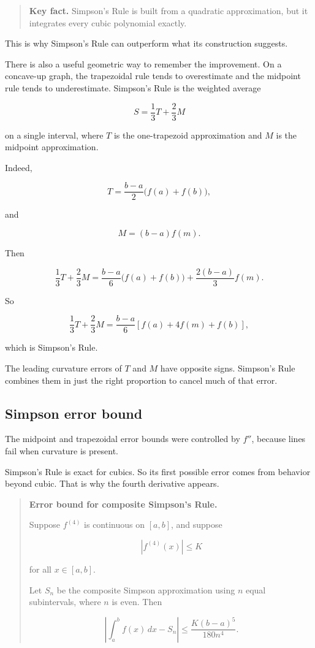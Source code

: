 \begin{quote}
\textbf{Key fact.}
Simpson's Rule is built from a quadratic approximation, but it integrates every cubic
polynomial exactly.
\end{quote}

This is why Simpson's Rule can outperform what its construction suggests.

There is also a useful geometric way to remember the improvement.  On a concave-up
graph, the trapezoidal rule tends to overestimate and the midpoint rule tends to
underestimate.  Simpson's Rule is the weighted average

\[
\boxed{
S=\frac13T+\frac23M
}
\]

on a single interval, where \(T\) is the one-trapezoid approximation and \(M\) is the
midpoint approximation.

Indeed,

\[
T=\frac{b-a}{2}\bigl(f(a)+f(b)\bigr),
\]

and

\[
M=(b-a)f(m).
\]

Then

\[
\frac13T+\frac23M
=
\frac{b-a}{6}\bigl(f(a)+f(b)\bigr)
+
\frac{2(b-a)}{3}f(m).
\]

So

\[
\frac13T+\frac23M
=
\frac{b-a}{6}
\left[
f(a)+4f(m)+f(b)
\right],
\]

which is Simpson's Rule.

The leading curvature errors of \(T\) and \(M\) have opposite signs.  Simpson's Rule
combines them in just the right proportion to cancel much of that error.

\subsection{Simpson error bound}
\label{subsec:simpson-error-bound}

The midpoint and trapezoidal error bounds were controlled by \(f''\), because lines
fail when curvature is present.

Simpson's Rule is exact for cubics.  So its first possible error comes from behavior
beyond cubic.  That is why the fourth derivative appears.

\begin{quote}
\textbf{Error bound for composite Simpson's Rule.}

Suppose \(f^{(4)}\) is continuous on \([a,b]\), and suppose

\[
|f^{(4)}(x)|\le K
\]

for all \(x\in[a,b]\).

Let \(S_n\) be the composite Simpson approximation using \(n\) equal subintervals,
where \(n\) is even.  Then

\[
\boxed{
\left|
\int_a^b f(x)\,dx-S_n
\right|
\le
\frac{K(b-a)^5}{180n^4}.
}
\]
\end{quote}

